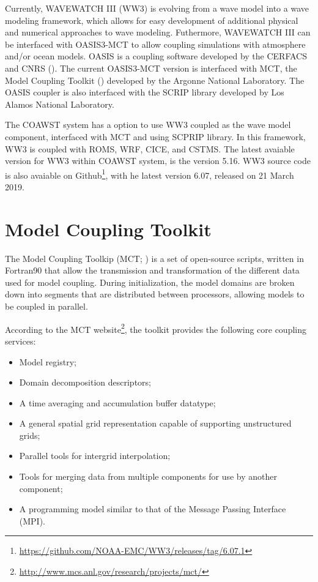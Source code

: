 \noindent Currently,  WAVEWATCH III (WW3) is evolving from a wave model into a wave modeling framework, which allows for easy development of additional 
physical and numerical approaches to wave modeling. Futhermore,  WAVEWATCH III can be interfaced with OASIS3-MCT to allow coupling simulations with 
atmosphere and/or ocean models. OASIS is a coupling software developed by the CERFACS and CNRS (\cite{Valcke2013}). The current OASIS3-MCT version is 
interfaced with MCT, the Model Coupling Toolkit (\cite{Larson2005}) developed by the Argonne National Laboratory. The OASIS coupler is also interfaced 
with the SCRIP library developed by Los Alamos National Laboratory. 
\bigskip

\noindent The COAWST system has a option to use WW3 coupled as the wave model component, interfaced with MCT and using SCPRIP library. In this framework, WW3 is 
coupled with ROMS, WRF, CICE, and CSTMS. The latest avaiable version for WW3 within COAWST system, 
is the version 5.16. WW3 source code is also avaiable on Github\textcolor{bleu_cite}{\textit{}\footnote{\textcolor{bleu_cite}{\href{https://github.com/NOAA-EMC/WW3/releases/tag/6.07.1}{https://github.com/NOAA-EMC/WW3/releases/tag/6.07.1}}}}, with he latest 
version 6.07, released on 21 March 2019.


\section{Model Coupling Toolkit}\label{mctsecao}
\bigskip

\noindent  The Model Coupling Toolkip (MCT; \cite{Larson2005, Jacob2005, Warner2008}) is a set of open-source scripts, written in Fortran90 that allow the transmission 
and transformation of the different data used for model coupling. During initialization, the model domains are broken down into segments that are distributed
between processors, allowing models to be coupled in parallel.
\bigskip

\noindent According to the MCT website\textcolor{bleu_cite}{\textit{}\footnote{\textcolor{bleu_cite}{\href{http://www.mcs.anl.gov/research/projects/mct/}{http://www.mcs.anl.gov/research/projects/mct/}}}}, 
the toolkit provides the following core coupling services:
\bigskip

\begin{itemize}
\item Model registry;
\item Domain decomposition descriptors;
\item A time averaging and accumulation buffer datatype;
\item A general spatial grid representation capable of supporting unstructured grids;
\item Parallel tools for intergrid interpolation;
\item Tools for merging data from multiple components for use by another component;
\item A programming model similar to that of the Message Passing Interface (MPI). 
\end{itemize}
\bigskip

